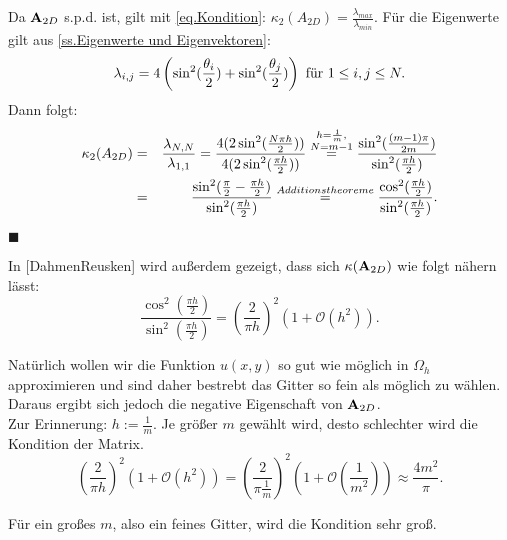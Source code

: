 Da ${\textbf{A}}_{2D}$ s.p.d. ist, gilt mit \autoref{eq.Kondition}: $\kappa_{2} (A_{2D}) = \frac {\lambda_{max}} {\lambda_{min}}$. Für die Eigenwerte gilt aus \autoref{ss.Eigenwerte und Eigenvektoren}:
\begin{equation}
\lambda_{i,j} = 4 \left(\sin^{2}(\frac {\theta_{i}} {2}) + \sin^{2}(\frac {\theta_{j}} {2}) \right) \textnormal{ für } 1 \le i,j \le N. \notag
\end{equation}
Dann folgt:
\begin{eqnarray}
\kappa_{2} (A_{2D}) &=& \frac {\lambda_{N,N}} {\lambda_{1,1}} = \frac {4(2\sin^{2}(\frac {N \pi h} {2}))} {4(2\sin^{2}(\frac {\pi h} {2}))} \overset{\substack{h=\frac {1} {m}, \\ N=m-1}}{=} \frac {\sin^{2}(\frac {(m-1) \pi} {2m})} {\sin^{2}(\frac {\pi h} {2})} \notag \\
&=& \frac {\sin^{2} (\frac {\pi} {2} - \frac {\pi h} {2})} {\sin^{2} (\frac {\pi h} {2})} \overset{Additionstheoreme}{=} \frac {\cos^{2} (\frac {\pi h} {2})} {\sin^{2} (\frac {\pi h} {2})}. \notag
\end{eqnarray}
\begin{flushright}
$\blacksquare$
\end{flushright}
In [DahmenReusken] wird außerdem gezeigt, dass sich $\kappa({\textbf{A}}_{2D})$ wie folgt nähern lässt:
\begin{equation}
\frac {\cos^{2} (\frac {\pi h} {2})} {\sin^{2} (\frac {\pi h} {2})} = \left( \frac {2} {\pi h} \right)^{2} (1 + \mathcal{O}(h^{2})).
\end{equation}

Natürlich wollen wir die Funktion $u(x,y)$ so gut wie möglich in $\Omega_{h}$ approximieren und sind daher bestrebt das Gitter so fein als möglich zu wählen. Daraus ergibt sich jedoch die negative Eigenschaft von ${\textbf{A}}_{2D}$. \\
Zur Erinnerung: $h := \frac {1} {m}$. Je größer $m$ gewählt wird, desto schlechter wird die Kondition der Matrix.
\begin{equation}
\left( \frac {2} {\pi h} \right)^{2} (1 + \mathcal{O}(h^{2})) = \left( \frac {2} {\pi \frac {1} {m}} \right)^{2} (1 + \mathcal{O}(\frac {1} {m^{2}})) \approx \frac {4m^{2}} {\pi}.
\end{equation}

Für ein großes $m$, also ein feines Gitter, wird die Kondition sehr groß.

